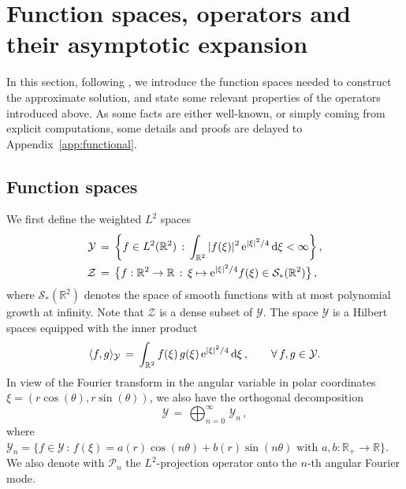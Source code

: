 \documentclass[11pt,reqno,a4paper]{amsart}
\def\dd{{\rm d}}
\def\e{{\rm e}}
\def\RR {\mathbb{R}}
\newcommand{\cP}{\mathcal{P}}
\newcommand{\cS}{\mathcal{S}}
\newcommand{\cY}{\mathcal{Y}}
\newcommand{\cZ}{\mathcal{Z}}
\newcommand{\1}{\mathbbm{1}}
\theoremstyle{definition}
\theoremstyle{definition}
\numberwithin{equation}{section}
\begin{document}
\section{Function spaces, operators and their asymptotic expansion}
\label{sec:Func}In this section, following \cite{GalWay2005,Gallay2011,dolce2024long}, we introduce the function spaces needed to construct the approximate solution, and state some relevant properties of the operators introduced above. As some facts are either well-known, or simply coming from explicit computations, some details and proofs are delayed to Appendix~\ref{app:functional}.

\subsection{Function spaces}

We first define the weighted $L^2$ spaces 
\begin{align}
\label{def:cY}
  \cY \,&=\, \biggl\{f\in L^2(\RR^2)\,:\, \int_{\RR^2} |f(\xi)|^2
  \,\e^{|\xi|^2/4}\,\dd \xi < \infty\biggr\}\,,\\
  \label{def:calZ}
  \cZ \,&=\, \bigl\{f:\RR^2\to \RR \,:\, \xi \mapsto \e^{|\xi|^2/4}f(\xi) \in
  \cS_*(\RR^2)\bigr\}\,,
\end{align}
where $\cS_*(\RR^2)$ denotes the space of smooth functions with at most
polynomial growth at infinity. Note that $\cZ$ is a dense subset of $\cY$. The space $\cY$ is a Hilbert spaces equipped with the inner product 
\begin{equation}
  \langle{f,g}\rangle_{\cY} \,=\, \int_{\RR^2}f(\xi)\,g(\xi)\,\e^{|\xi|^2/4}\,\dd \xi\,, \qquad
  \forall\,f,g \in \cY.
\end{equation}
In view of the Fourier transform in the angular variable in polar coordinates $\xi=(r\cos(\theta),r\sin(\theta))$,  we also have the orthogonal decomposition 
\begin{equation}\label{Ydecomp}
  \cY \,= \,\bigoplus_{n=0}^{\infty}\,\cY_n\,,
\end{equation}
where $\cY_n = \bigl\{f\in \cY\,:\, f(\xi) = a(r)\cos(n\theta) + b(r)\sin(n\theta) \text{ with }  a,b:
\RR_+\to\RR\bigr\}$. We also denote with $\cP_n$ the $L^2$-projection operator onto the $n$-th angular Fourier mode.
\end{document}
